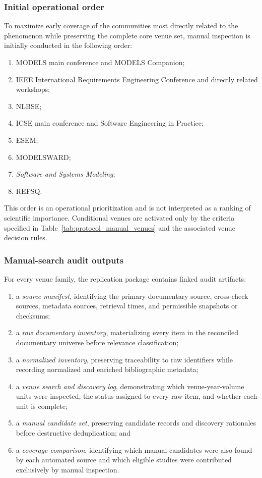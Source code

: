 \subsubsection{Initial operational order}

To maximize early coverage of the communities most directly related to the phenomenon while
preserving the complete core venue set, manual inspection is initially conducted in the following
order:

\begin{enumerate}[label=\arabic*)]
    \item MODELS main conference and MODELS Companion;
    \item IEEE International Requirements Engineering Conference and directly related workshops;
    \item NLBSE;
    \item ICSE main conference and Software Engineering in Practice;
    \item ESEM;
    \item MODELSWARD;
    \item \emph{Software and Systems Modeling};
    \item REFSQ.
\end{enumerate}

This order is an operational prioritization and is not interpreted as a ranking of scientific
importance. Conditional venues are activated only by the criteria specified in
Table~\ref{tab:protocol_manual_venues} and the associated venue decision rules.

\subsubsection{Manual-search audit outputs}

For every venue family, the replication package contains linked audit artifacts:

\begin{enumerate}[label=\arabic*)]
    \item a \emph{source manifest}, identifying the primary documentary source, cross-check sources,
    metadata sources, retrieval times, and permissible snapshots or checksums;
    \item a \emph{raw documentary inventory}, materializing every item in the reconciled documentary
    universe before relevance classification;
    \item a \emph{normalized inventory}, preserving traceability to raw identifiers while recording
    normalized and enriched bibliographic metadata;
    \item a \emph{venue search and discovery log}, demonstrating which venue-year-volume units were
    inspected, the status assigned to every raw item, and whether each unit is complete;
    \item a \emph{manual candidate set}, preserving candidate records and discovery rationales before
    destructive deduplication; and
    \item a \emph{coverage comparison}, identifying which manual candidates were also found by each
    automated source and which eligible studies were contributed exclusively by manual inspection.
\end{enumerate}

